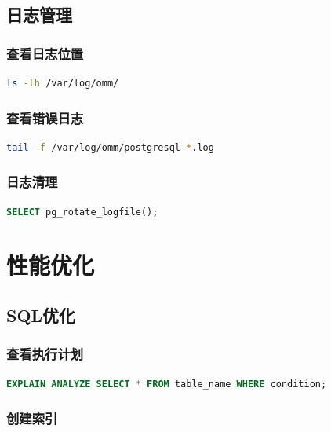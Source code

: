 \documentclass[12pt,UTF8]{ctexbook}
\begin{document}
\section{日志管理}

\subsection{查看日志位置}

\begin{lstlisting}[language=bash, caption=查看日志目录]
ls -lh /var/log/omm/
\end{lstlisting}

\subsection{查看错误日志}

\begin{lstlisting}[language=bash, caption=查看数据库日志]
tail -f /var/log/omm/postgresql-*.log
\end{lstlisting}

\subsection{日志清理}

\begin{lstlisting}[language=sql, caption=清理旧日志]
SELECT pg_rotate_logfile();
\end{lstlisting}

\chapter{性能优化}

\section{SQL优化}

\subsection{查看执行计划}

\begin{lstlisting}[language=sql, caption=查看SQL执行计划]
EXPLAIN ANALYZE SELECT * FROM table_name WHERE condition;
\end{lstlisting}

\subsection{创建索引}
\end{document}

